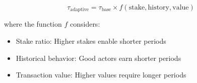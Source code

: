 \begin{equation}
\tau_{\text{adaptive}} = \tau_{\text{base}} \times f(\text{stake}, \text{history}, \text{value})
\end{equation}

where the function $f$ considers:
\begin{itemize}
    \item Stake ratio: Higher stakes enable shorter periods
    \item Historical behavior: Good actors earn shorter periods
    \item Transaction value: Higher values require longer periods
\end{itemize}

